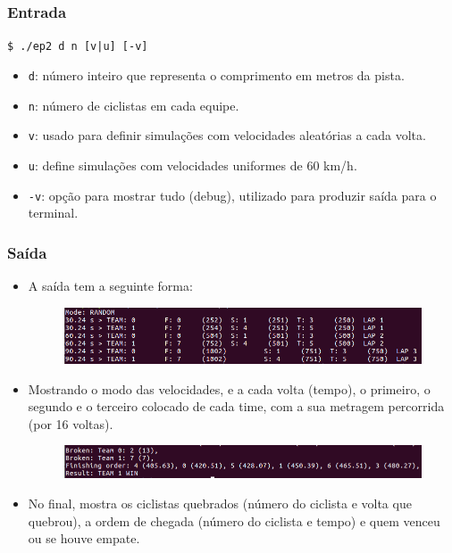 \documentclass{beamer}
\begin{document}
\begin{frame}
	\frametitle{Entrada}
	\begin{center}
		\texttt{\$ ./ep2 d n [v|u] [-v]}
	\end{center}	
	\begin{itemize}
		\item \texttt{d}: número inteiro que representa o comprimento em metros da pista.
		\item \texttt{n}: número de ciclistas em cada equipe. 
		\item \texttt{v}: usado para definir simulações com velocidades aleatórias a cada volta. 
		\item \texttt{u}: define simulações com velocidades uniformes de 60 km/h.  
		\item \texttt{-v}: opção para mostrar tudo (debug), utilizado para produzir saída para o terminal. 
	\end{itemize} 
\end{frame}

\begin{frame}
	\frametitle{Saída}
	\begin{itemize}
		\item A saída tem a seguinte forma:
		\begin{figure}[!h]
			\centering
			\includegraphics[scale=0.4]{5-a.png}
		\end{figure}
		\item Mostrando o modo das velocidades, e a cada volta (tempo), o primeiro, o segundo e o terceiro colocado de cada time, com a sua metragem percorrida (por 16 voltas).
		\begin{figure}[!h]
			\centering
			\includegraphics[scale=0.4]{5-b.png}
		\end{figure}
		\item No final, mostra os ciclistas quebrados (número do ciclista e volta que quebrou), a ordem de chegada (número do ciclista e tempo) e quem venceu ou se houve empate.
	\end{itemize}
\end{frame}
	
\end{document}
